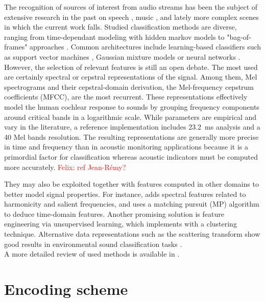 \documentclass[sensors,article,submit,moreauthors,pdftex,10pt,a4paper]{mdpi}
\newcommand{\fg}[1]{\textcolor{red}{ Felix: #1}}
\begin{document}
The recognition of sources of interest from audio streams has been the subject of extensive research in the past on speech \cite{anusuya2009}, music \cite{tzanetakis2002}, and lately more complex scenes in which the current work falls. Studied classification methods are diverse, ranging from time-dependant modeling with hidden markov models \cite{ntalampiras2014} to "bag-of-frames" approaches \cite{aucouturier2007, foggia2015}. Common architectures include learning-based classifiers such as support vector machines \cite{kumar2016}, Gaussian mixture models \cite{radhakrishnan2005} or neural networks \cite{salamon2017, piczak2015}. However, the selection of relevant features is still an open debate. The most used are certainly spectral \cite{khunarsal2013} or cepstral \cite{couvreur2004} representations of the signal. Among them, Mel spectrograms and their cepstral-domain derivation, the Mel-frequency cepstrum coefficients (MFCC), are the most recurrent. These representations effectively model the human cochlear response to sounds by grouping frequency components around critical bands in a logarithmic scale. While parameters are empirical and vary in the literature, a reference implementation includes 23.2~ms analysis and a 40 Mel bands resolution. The resulting representations are generally more precise in time and frequency than in acoustic monitoring applications because it is a primordial factor for classification whereas acoustic indicators must be computed more accurately.\fg{ref Jean-R\'emy?}

They may also be exploited together with features computed in other domains to better model signal properties. For instance, \cite{cai2006} adds spectral features related to harmonicity and salient frequencies, and \cite{chu2009} uses a matching pursuit (MP) algorithm to deduce time-domain features. Another promising solution is feature engineering via unsupervised learning, which \cite{salamon2015-2} implements with a clustering technique. Alternative data representations such as the scattering transform \cite{bauge2013} show good results in environmental sound classification tasks \cite{salamon2015}.\\
A more detailed review of used methods is available in \cite{chachada2013}.

\section{Encoding scheme} \label{sec:coder}
\end{document}
